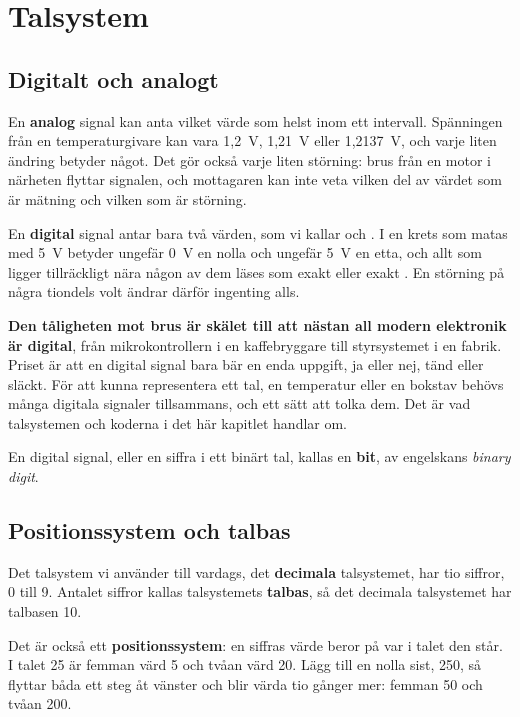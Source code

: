 
\section{Talsystem}
\label{c1:app:a}

\subsection{Digitalt och analogt}
\label{c1:a1}
En \textbf{analog} signal kan anta vilket värde som helst inom ett intervall. Spänningen från en
temperaturgivare kan vara 1,2~V, 1,21~V eller 1,2137~V, och varje liten ändring betyder något. Det
gör också varje liten störning: brus från en motor i närheten flyttar signalen, och mottagaren
kan inte veta vilken del av värdet som är mätning och vilken som är störning.

En \textbf{digital} signal antar bara två värden, som vi kallar  och . I en krets
som matas med 5~V betyder ungefär 0~V en nolla och ungefär 5~V en etta, och allt som ligger
tillräckligt nära någon av dem läses som exakt  eller exakt . En störning på några
tiondels volt ändrar därför ingenting alls.

\textbf{Den tåligheten mot brus är skälet till att nästan all modern elektronik är digital}, från
mikrokontrollern i en kaffebryggare till styrsystemet i en fabrik. Priset är att en digital signal
bara bär en enda uppgift, ja eller nej, tänd eller släckt. För att kunna representera ett tal, en
temperatur eller en bokstav behövs många digitala signaler tillsammans, och ett sätt att tolka
dem. Det är vad talsystemen och koderna i det här kapitlet handlar om.

En digital signal, eller en siffra i ett binärt tal, kallas en \textbf{bit}, av engelskans
\emph{binary digit}.

\subsection{Positionssystem och talbas}
\label{c1:a2}
Det talsystem vi använder till vardags, det \textbf{decimala} talsystemet, har tio siffror, 0
till 9. Antalet siffror kallas talsystemets \textbf{talbas}, så det decimala talsystemet har
talbasen 10.

Det är också ett \textbf{positionssystem}: en siffras värde beror på var i talet den står. I talet
25 är femman värd 5 och tvåan värd 20. Lägg till en nolla sist, 250, så flyttar båda ett steg åt
vänster och blir värda tio gånger mer: femman 50 och tvåan 200.

